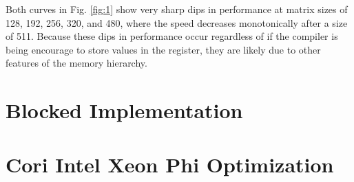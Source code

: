\documentclass[10pt]{article}
\begin{document}
Both curves in Fig. \ref{fig:1} show very sharp dips in performance at matrix sizes of 128, 192, 256, 320, and 480, where the speed decreases monotonically after a size of 511. Because these dips in performance occur regardless of if the compiler is being encourage to store values in the register, they are likely due to other features of the memory hierarchy. 

\section{Blocked Implementation}

\section{Cori Intel Xeon Phi Optimization}
\end{document}
